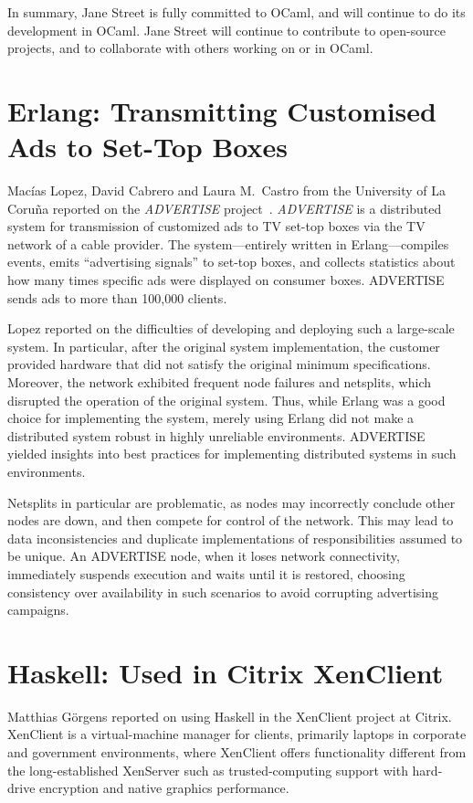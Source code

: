 \documentclass{jfp1}
\begin{document}
In summary, Jane Street is fully committed to OCaml, and will continue
to do its development in OCaml.  Jane Street will continue to
contribute to open-source projects, and to collaborate with others
working on or in OCaml.

\section{Erlang: Transmitting Customised Ads to Set-Top Boxes}

Macías Lopez, David Cabrero and Laura M.\ Castro from the University
of La Coruña reported on the \textit{ADVERTISE}
project~\cite{Lopez:2012:DDA:2370776.2370800,
  Lopez:2012:FTC:2364489.2364498}.  \textit{ADVERTISE} is a
distributed system for transmission of customized ads to TV set-top
boxes via the TV network of a cable provider.  The system---entirely
written in Erlang---compiles events, emits ``advertising signals'' to
set-top boxes, and collects statistics about how many times specific
ads were displayed on consumer boxes.  ADVERTISE sends ads to more
than 100,000 clients.

Lopez reported on the difficulties of developing and deploying such a
large-scale system.  In particular, after the original system
implementation, the customer provided hardware that did not
satisfy the original minimum specifications.  Moreover, the network
exhibited frequent node failures and netsplits, which disrupted the
operation of the original system.  Thus, while Erlang was a good
choice for implementing the system, merely using Erlang did not make
a distributed system robust in highly unreliable environments.
ADVERTISE yielded insights into best practices for implementing
distributed systems in such environments.

Netsplits in particular are problematic, as nodes may incorrectly
conclude other nodes are down, and then compete for control of the
network.  This may lead to data inconsistencies and duplicate
implementations of responsibilities assumed to be unique. An ADVERTISE
node, when it loses network connectivity, immediately suspends
execution and waits until it is restored, choosing consistency over
availability in such scenarios to avoid corrupting advertising
campaigns.

\section{Haskell: Used in Citrix XenClient}

Matthias Görgens reported on using Haskell in the XenClient project at
Citrix. XenClient is a virtual-machine manager for clients, primarily
laptops in corporate and government environments, where XenClient
offers functionality different from the long-established XenServer
such as trusted-computing support with hard-drive encryption and
native graphics performance.
\end{document}
